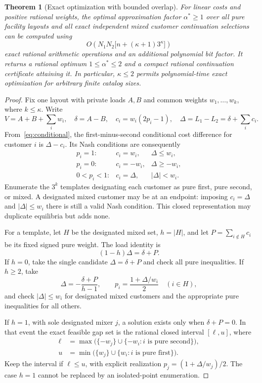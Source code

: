 \documentclass[11pt]{article}
\newtheorem{theorem}{Theorem}[section]
\theoremstyle{definition}
\theoremstyle{remark}
\begin{document}
\begin{theorem}[Exact optimization with bounded overlap]\label{thm:fpt}
For linear costs and positive rational weights, the optimal approximation factor $\alpha^*\ge1$ over all pure facility layouts and all exact independent mixed customer continuation selections can be computed using
\[
 O\!\left(N_1N_2\bigl[n+(\kappa+1)3^\kappa\bigr]\right)
\]
exact rational arithmetic operations and an additional polynomial bit factor. It returns a rational optimum $1\le\alpha^*\le2$ and a compact rational continuation certificate attaining it. In particular, $\kappa\le2$ permits polynomial-time exact optimization for arbitrary finite catalog sizes.
\end{theorem}
\begin{proof}
Fix one layout with private loads $A,B$ and common weights $w_1,\ldots,w_k$, where $k\le\kappa$. Write
\[
 V=A+B+\sum_iw_i,\quad \delta=A-B,\quad
 c_i=w_i(2p_i-1),\quad \Delta=L_1-L_2=\delta+\sum_i c_i.
\]
From~\eqref{eq:conditional}, the first-minus-second conditional cost difference for customer $i$ is $\Delta-c_i$. Its Nash conditions are consequently
\[
\begin{array}{lll}
 p_i=1:&c_i=w_i,&\Delta\le w_i,\\
 p_i=0:&c_i=-w_i,&\Delta\ge-w_i,\\
 0<p_i<1:&c_i=\Delta,&|\Delta|<w_i.
\end{array}
\]
Enumerate the $3^k$ templates designating each customer as pure first, pure second, or mixed. A designated mixed customer may be at an endpoint: imposing $c_i=\Delta$ and $|\Delta|\le w_i$ there is still a valid Nash condition. This closed representation may duplicate equilibria but adds none.

For a template, let $H$ be the designated mixed set, $h=|H|$, and let $P=\sum_{i\notin H}c_i$ be its fixed signed pure weight. The load identity is
\begin{equation}\label{eq:support-gap}
 (1-h)\Delta=\delta+P.
\end{equation}
If $h=0$, take the single candidate $\Delta=\delta+P$ and check all pure inequalities. If $h\ge2$, take
\[
 \Delta=-\frac{\delta+P}{h-1},\qquad
 p_i=\frac{1+\Delta/w_i}{2}\quad(i\in H),
\]
and check $|\Delta|\le w_i$ for designated mixed customers and the appropriate pure inequalities for all others.

If $h=1$, with sole designated mixer $j$, a solution exists only when $\delta+P=0$. In that event the exact feasible gap set is the rational closed interval $[\ell,u]$, where
\begin{align*}
 \ell&=\max\bigl(\{-w_j\}\cup\{-w_i:i\text{ is pure second}\}\bigr),\\
 u&=\min\bigl(\{w_j\}\cup\{w_i:i\text{ is pure first}\}\bigr).
\end{align*}
Keep the interval if $\ell\le u$, with explicit realization $p_j=(1+\Delta/w_j)/2$. The case $h=1$ cannot be replaced by an isolated-point enumeration.


\end{proof}
\end{document}
